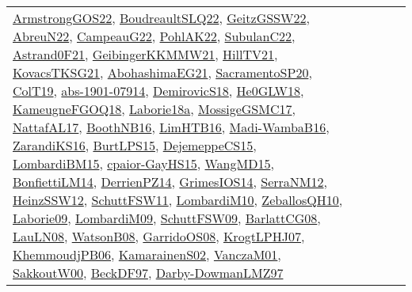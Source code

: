 {\begin{longtable}{llp{6cm}p{6cm}p{6cm}}
\href{papers/ArmstrongGOS22.pdf}{ArmstrongGOS22}\cite{ArmstrongGOS22}, \href{papers/BoudreaultSLQ22.pdf}{BoudreaultSLQ22}\cite{BoudreaultSLQ22}, \href{papers/GeitzGSSW22.pdf}{GeitzGSSW22}\cite{GeitzGSSW22}, \href{articles/AbreuN22.pdf}{AbreuN22}\cite{AbreuN22}, \href{articles/CampeauG22.pdf}{CampeauG22}\cite{CampeauG22}, \href{articles/PohlAK22.pdf}{PohlAK22}\cite{PohlAK22}, \href{articles/SubulanC22.pdf}{SubulanC22}\cite{SubulanC22}, \href{papers/Astrand0F21.pdf}{Astrand0F21}\cite{Astrand0F21}, \href{papers/GeibingerKKMMW21.pdf}{GeibingerKKMMW21}\cite{GeibingerKKMMW21}, \href{papers/HillTV21.pdf}{HillTV21}\cite{HillTV21}, \href{papers/KovacsTKSG21.pdf}{KovacsTKSG21}\cite{KovacsTKSG21}, \href{articles/AbohashimaEG21.pdf}{AbohashimaEG21}\cite{AbohashimaEG21}, \href{articles/SacramentoSP20.pdf}{SacramentoSP20}\cite{SacramentoSP20}, \href{papers/ColT19.pdf}{ColT19}\cite{ColT19}, \href{articles/abs-1901-07914.pdf}{abs-1901-07914}\cite{abs-1901-07914}, \href{papers/DemirovicS18.pdf}{DemirovicS18}\cite{DemirovicS18}, \href{papers/He0GLW18.pdf}{He0GLW18}\cite{He0GLW18}, \href{papers/KameugneFGOQ18.pdf}{KameugneFGOQ18}\cite{KameugneFGOQ18}, \href{papers/Laborie18a.pdf}{Laborie18a}\cite{Laborie18a}, \href{papers/MossigeGSMC17.pdf}{MossigeGSMC17}\cite{MossigeGSMC17}, \href{articles/NattafAL17.pdf}{NattafAL17}\cite{NattafAL17}, \href{papers/BoothNB16.pdf}{BoothNB16}\cite{BoothNB16}, \href{papers/LimHTB16.pdf}{LimHTB16}\cite{LimHTB16}, \href{papers/Madi-WambaB16.pdf}{Madi-WambaB16}\cite{Madi-WambaB16}, \href{articles/ZarandiKS16.pdf}{ZarandiKS16}\cite{ZarandiKS16}, \href{papers/BurtLPS15.pdf}{BurtLPS15}\cite{BurtLPS15}, \href{papers/DejemeppeCS15.pdf}{DejemeppeCS15}\cite{DejemeppeCS15}, \href{papers/LombardiBM15.pdf}{LombardiBM15}\cite{LombardiBM15}, \href{papers/cpaior-GayHS15.pdf}{cpaior-GayHS15}\cite{cpaior-GayHS15}, \href{articles/WangMD15.pdf}{WangMD15}\cite{WangMD15}, \href{papers/BonfiettiLM14.pdf}{BonfiettiLM14}\cite{BonfiettiLM14}, \href{papers/DerrienPZ14.pdf}{DerrienPZ14}\cite{DerrienPZ14}, \href{articles/GrimesIOS14.pdf}{GrimesIOS14}\cite{GrimesIOS14}, \href{papers/SerraNM12.pdf}{SerraNM12}\cite{SerraNM12}, \href{articles/HeinzSSW12.pdf}{HeinzSSW12}\cite{HeinzSSW12}, \href{articles/SchuttFSW11.pdf}{SchuttFSW11}\cite{SchuttFSW11}, \href{papers/LombardiM10.pdf}{LombardiM10}\cite{LombardiM10}, \href{articles/ZeballosQH10.pdf}{ZeballosQH10}\cite{ZeballosQH10}, \href{papers/Laborie09.pdf}{Laborie09}\cite{Laborie09}, \href{papers/LombardiM09.pdf}{LombardiM09}\cite{LombardiM09}, \href{papers/SchuttFSW09.pdf}{SchuttFSW09}\cite{SchuttFSW09}, \href{papers/BarlattCG08.pdf}{BarlattCG08}\cite{BarlattCG08}, \href{papers/LauLN08.pdf}{LauLN08}\cite{LauLN08}, \href{papers/WatsonB08.pdf}{WatsonB08}\cite{WatsonB08}, \href{articles/GarridoOS08.pdf}{GarridoOS08}\cite{GarridoOS08}, \href{papers/KrogtLPHJ07.pdf}{KrogtLPHJ07}\cite{KrogtLPHJ07}, \href{papers/KhemmoudjPB06.pdf}{KhemmoudjPB06}\cite{KhemmoudjPB06}, \href{papers/KamarainenS02.pdf}{KamarainenS02}\cite{KamarainenS02}, \href{papers/VanczaM01.pdf}{VanczaM01}\cite{VanczaM01}, \href{articles/SakkoutW00.pdf}{SakkoutW00}\cite{SakkoutW00}, \href{papers/BeckDF97.pdf}{BeckDF97}\cite{BeckDF97}, \href{articles/Darby-DowmanLMZ97.pdf}{Darby-DowmanLMZ97}\cite{Darby-DowmanLMZ97}\\

\end{longtable}}
